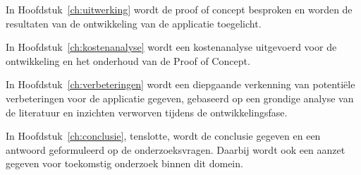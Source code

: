 
In Hoofdstuk~\ref{ch:uitwerking} wordt de proof of concept besproken en worden de resultaten van de ontwikkeling van de applicatie toegelicht.

In Hoofdstuk~\ref{ch:kostenanalyse} wordt een kostenanalyse uitgevoerd voor de ontwikkeling en het onderhoud van de Proof of Concept.

In Hoofdstuk~\ref{ch:verbeteringen} wordt een diepgaande verkenning van potentiële verbeteringen voor de applicatie gegeven, gebaseerd op een grondige analyse van de literatuur en inzichten verworven tijdens de ontwikkelingsfase.

In Hoofdstuk~\ref{ch:conclusie}, tenslotte, wordt de conclusie gegeven en een antwoord geformuleerd op de onderzoeksvragen. Daarbij wordt ook een aanzet gegeven voor toekomstig onderzoek binnen dit domein.